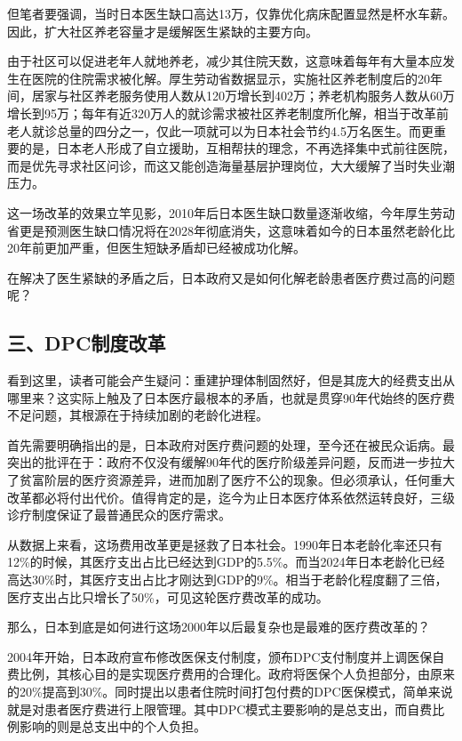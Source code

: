 但笔者要强调，当时日本医生缺口高达13万，仅靠优化病床配置显然是杯水车薪。因此，扩大社区养老容量才是缓解医生紧缺的主要方向。

由于社区可以促进老年人就地养老，减少其住院天数，这意味着每年有大量本应发生在医院的住院需求被化解。厚生劳动省数据显示，实施社区养老制度后的20年间，居家与社区养老服务使用人数从120万增长到402万；养老机构服务人数从60万增长到95万；每年有近320万人的就诊需求被社区养老制度所化解，相当于改革前老人就诊总量的四分之一，仅此一项就可以为日本社会节约4.5万名医生。而更重要的是，日本老人形成了自立援助，互相帮扶的理念，不再选择集中式前往医院，而是优先寻求社区问诊，而这又能创造海量基层护理岗位，大大缓解了当时失业潮压力。

这一场改革的效果立竿见影，2010年后日本医生缺口数量逐渐收缩，今年厚生劳动省更是预测医生缺口情况将在2028年彻底消失，这意味着如今的日本虽然老龄化比20年前更加严重，但医生短缺矛盾却已经被成功化解。

在解决了医生紧缺的矛盾之后，日本政府又是如何化解老龄患者医疗费过高的问题呢？

\subsection{三、DPC制度改革}

看到这里，读者可能会产生疑问：重建护理体制固然好，但是其庞大的经费支出从哪里来？这实际上触及了日本医疗最根本的矛盾，也就是贯穿90年代始终的医疗费不足问题，其根源在于持续加剧的老龄化进程。

首先需要明确指出的是，日本政府对医疗费问题的处理，至今还在被民众诟病。最突出的批评在于：政府不仅没有缓解90年代的医疗阶级差异问题，反而进一步拉大了贫富阶层的医疗资源差异，进而加剧了医疗不公的现象。但必须承认，任何重大改革都必将付出代价。值得肯定的是，迄今为止日本医疗体系依然运转良好，三级诊疗制度保证了最普通民众的医疗需求。

从数据上来看，这场费用改革更是拯救了日本社会。1990年日本老龄化率还只有12\%的时候，其医疗支出占比已经达到GDP的5.5\%。而当2024年日本老龄化已经高达30\%时，其医疗支出占比才刚达到GDP的9\%。相当于老龄化程度翻了三倍，医疗支出占比只增长了50\%，可见这轮医疗费改革的成功。

那么，日本到底是如何进行这场2000年以后最复杂也是最难的医疗费改革的？

2004年开始，日本政府宣布修改医保支付制度，颁布DPC支付制度并上调医保自费比例，其核心目的是实现医疗费用的合理化。政府将医保个人负担部分，由原来的20\%提高到30\%。同时提出以患者住院时间打包付费的DPC医保模式，简单来说就是对患者医疗费进行上限管理。其中DPC模式主要影响的是总支出，而自费比例影响的则是总支出中的个人负担。

